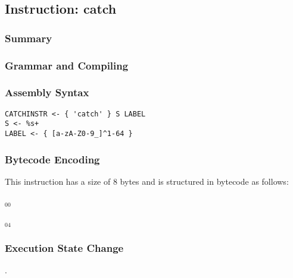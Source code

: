 \subsection{Instruction: catch}

\subsubsection{Summary}


\subsubsection{Grammar and Compiling}


\subsubsection{Assembly Syntax}

\begin{myquote}
\begin{verbatim}
CATCHINSTR <- { 'catch' } S LABEL
S <- %s+
LABEL <- { [a-zA-Z0-9_]^1-64 }
\end{verbatim}
\end{myquote}


\subsubsection{Bytecode Encoding}

This instruction has a size of 8 bytes and is structured in bytecode as follows:

$_{00}$\ 



$_{04}$\ 


\subsubsection{Execution State Change}

.


